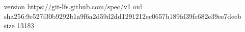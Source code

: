 version https://git-lfs.github.com/spec/v1
oid sha256:9e527f30b9292b1a9f6a2d59d2dd1291212ec0657b189fd39fe682e39ee7deeb
size 13183
